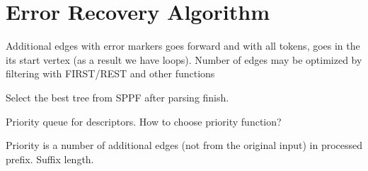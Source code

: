 \section{Error Recovery Algorithm}



Additional edges with error markers goes forward and with all tokens, goes in the its start vertex 
(as a result we have loops).
Number of edges may be optimized by filtering with FIRST/REST and other functions

Select the best tree from SPPF after parsing finish.

Priority queue for descriptors. 
How to choose priority function?

Priority is a number of additional edges (not from the original input) in processed prefix.
Suffix length.

